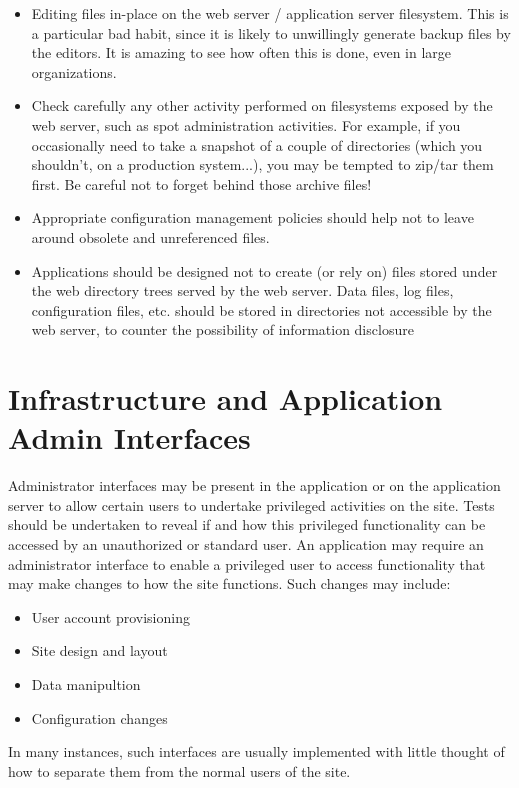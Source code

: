 		\begin{itemize}
			\item Editing files in-place on the web server / application server filesystem. 
			This is a particular bad habit, since it is likely to unwillingly generate backup 
			files by the editors. It is amazing to see how often this is done, even in large
			organizations.
			\item Check carefully any other activity performed on filesystems exposed by the 
			web server, such as spot administration activities. For example, if you occasionally 
			need to take a snapshot of a couple of directories (which you shouldn’t, on a 
			production system...), you may be tempted to zip/tar them first. Be careful not to 
			forget behind those archive files!
			\item Appropriate configuration management policies should help not to leave around 
			obsolete and unreferenced files.
			\item Applications should be designed not to create (or rely on) files stored under 
			the web directory trees served by the web server. Data files, log files, configuration 
			files, etc. should be stored in directories not accessible by the web server, to 
			counter the possibility of information disclosure
		\end{itemize}


\section{Infrastructure and Application Admin Interfaces}

	Administrator interfaces may be present in the application or on the application server to allow 
	certain users to undertake privileged activities on the site. Tests should be undertaken to 
	reveal if and how this privileged functionality can be accessed by an unauthorized or standard 
	user. An application may require an administrator interface to enable a privileged user to access
	functionality that may make changes to how the site functions. Such changes may include:
		\begin{itemize}
			\item User account provisioning
			\item Site design and layout
			\item Data manipultion
			\item Configuration changes
		\end{itemize}

	In many instances, such interfaces are usually implemented with little thought of how to separate 
	them from the normal users of the site. 

